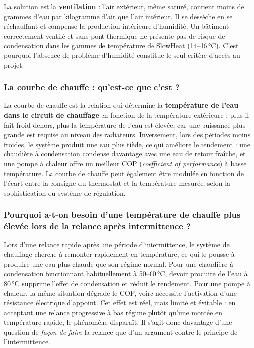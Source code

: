 La solution est la \textbf{ventilation} : l'air extérieur, même saturé, contient moins de grammes d'eau par kilogramme d'air que l'air intérieur. Il se dessèche en se réchauffant et compense la production intérieure d'humidité. Un bâtiment correctement ventilé et sans pont thermique ne présente pas de risque de condensation dans les gammes de température de SlowHeat (14--16\,°C). C'est pourquoi l'absence de problème d'humidité constitue le seul critère d'accès au projet.

\subsubsection{La courbe de chauffe : qu'est-ce que c'est ?}

La courbe de chauffe est la relation qui détermine la \textbf{température de l'eau dans le circuit de chauffage} en fonction de la température extérieure : plus il fait froid dehors, plus la température de l'eau est élevée, car une puissance plus grande est requise au niveau des radiateurs. Inversement, lors des périodes moins froides, le système produit une eau plus tiède, ce qui améliore le rendement : une chaudière à condensation condense davantage avec une eau de retour fraîche, et une pompe à chaleur offre un meilleur COP (\textit{coefficient of performance}) à basse température. La courbe de chauffe peut également être modulée en fonction de l'écart entre la consigne du thermostat et la température mesurée, selon la sophistication du système de régulation.

\subsubsection{Pourquoi a-t-on besoin d'une température de chauffe plus élevée lors de la relance après intermittence ?}

Lors d'une relance rapide après une période d'intermittence, le système de chauffage cherche à remonter rapidement en température, ce qui le pousse à produire une eau plus chaude que son régime normal. Pour une chaudière à condensation fonctionnant habituellement à 50--60\,°C, devoir produire de l'eau à 80\,°C supprime l'effet de condensation et réduit le rendement. Pour une pompe à chaleur, la même situation dégrade le COP, voire nécessite l'activation d'une résistance électrique d'appoint. Cet effet est réel, mais limité et évitable : en acceptant une relance progressive à bas régime plutôt qu'une montée en température rapide, le phénomène disparaît. Il s'agit donc davantage d'une question de \textit{façon de faire} la relance que d'un argument contre le principe de l'intermittence.

